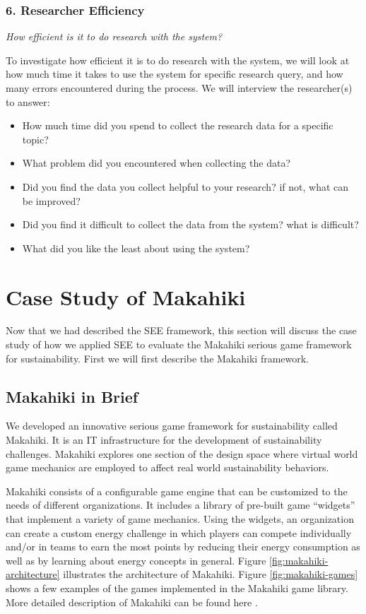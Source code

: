 \documentclass{sigchi}
\begin{document}
\subsubsection{6. Researcher Efficiency}

\emph{How efficient is it to do research with the system?}

To investigate how efficient it is to do research with the system, we
will look at how much time it takes to use the system for specific
research query, and how many errors encountered during the process. We
will interview the researcher(s) to answer:
\begin{itemize}
\item How much time did you spend to collect the research data for a
  specific topic?
\item What problem did you encountered when collecting the data?
\item Did you find the data you collect helpful to your research? if
  not, what can be improved?
\item Did you find it difficult to collect the data from the system?
  what is difficult?
\item What did you like the least about using the system?
\end{itemize}

\section{Case Study of Makahiki}

Now that we had described the SEE framework, this section will discuss
the case study of how we applied SEE to evaluate the Makahiki serious
game framework for sustainability. First we will first describe the
Makahiki framework.

\subsection{Makahiki in Brief}

We developed an innovative serious game framework for sustainability
called Makahiki. It is an IT infrastructure for the development of
sustainability challenges. Makahiki explores one section of the design
space where virtual world game mechanics are employed to affect real
world sustainability behaviors.

Makahiki consists of a configurable game engine that can be customized
to the needs of different organizations.  It includes a library of
pre-built game ``widgets'' that implement a variety of game mechanics.
Using the widgets, an organization can create a custom energy %
challenge in which players can compete individually and/or in teams to
earn the most points by reducing their energy consumption as well as
by learning about energy concepts in general. Figure
\ref{fig:makahiki-architecture} illustrates the architecture of
Makahiki. Figure \ref{fig:makahiki-games} shows a few examples of the
games implemented in the Makahiki game library. More detailed
description of Makahiki can be found here \cite{csdl2-12-06}.
\end{document}
